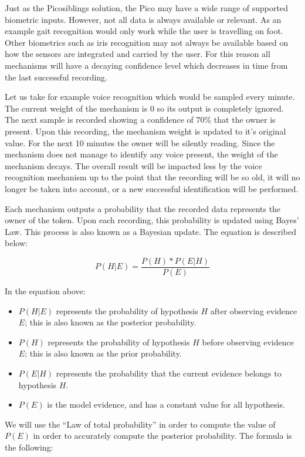 Just as the Picosiblings solution, the Pico may have a wide range of supported biometric inputs. However, not all data is always available or relevant. As an example gait recognition would only work while the user is travelling on foot. Other biometrics such as iris recognition may not always be available based on how the sensors are integrated and carried by the user. For this reason all mechanisms will have a decaying confidence level which decreases in time from the last successful recording.

Let us take for example voice recognition which would be sampled every minute. The current weight of the mechanism is 0 so its output is completely ignored. The next sample is recorded showing a confidence of 70\% that the owner is present. Upon this recording, the mechanism weight is updated to it's original value. For the next 10 minutes the owner will be silently reading. Since the mechanism does not manage to identify any voice present, the weight of the mechanism decays. The overall result will be impacted less by the voice recognition mechanism up to the point that the recording will be so old, it will no longer be taken into account, or a new successful identification will be performed.

Each mechanism outputs a probability that the recorded data represents the owner of the token. Upon each recording, this probability is updated using Bayes' Law. This process is also known as a Bayesian update. The equation is described below:

$$P(H|E) = \frac{P(H) * P(E|H)}{P(E)}$$

In the equation above:
\begin{itemize} 
	\item $P(H|E)$ represents the probability of hypothesis $H$ after observing evidence $E$; this is also known as the posterior probability. 
	\item $P(H)$ represents the probability of hypothesis $H$ before observing evidence $E$; this is also known as the prior probability.
	\item $P(E|H)$ represents the probability that the current evidence belongs to hypothesis $H$.
	\item $P(E)$ is the model evidence, and has a constant value for all hypothesis.
\end{itemize}

We will use the ``Law of total probability'' in order to compute the value of $P(E)$ in order to accurately compute the posterior probability. The formula is the following:

